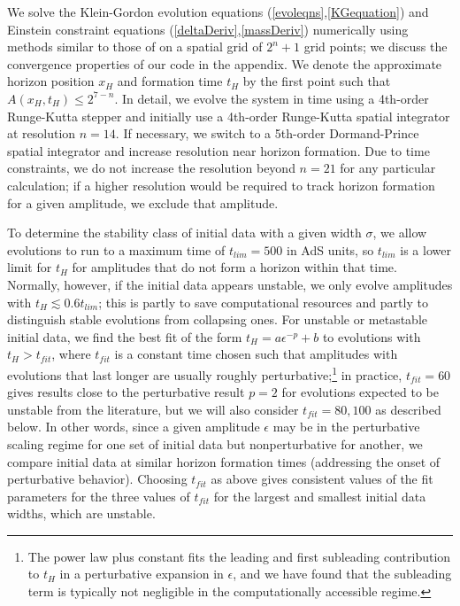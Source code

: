 \documentclass[../PhD.tex]{subfiles}
\begin{document}
We solve the Klein-Gordon evolution equations (\ref{evoleqns},\ref{KGequation})
and Einstein constraint equations (\ref{deltaDeriv},\ref{massDeriv})
numerically using methods similar to those of \cite{1308.1235} on a spatial
grid of $2^n+1$ grid points; we discuss the
convergence properties of our code in the appendix.
We denote the approximate horizon position $x_H$ and formation time $t_H$
by the first point such that $A(x_H,t_H)\leq 2^{7-n}$.
In detail, we evolve the system in time using a 4th-order Runge-Kutta
stepper and initially use a 4th-order Runge-Kutta spatial integrator at
resolution $n=14$.  If necessary, we switch to a 5th-order Dormand-Prince
spatial integrator and increase resolution near horizon formation.  Due to
time constraints, we do not increase the resolution beyond $n=21$ for any
particular calculation; if a higher resolution would be required to track
horizon formation for a given amplitude, we exclude that amplitude.

To determine the stability class of initial data with a given width $\sigma$,
we allow evolutions to run to a maximum time of $t_{lim}=500$ in AdS units, so
$t_{lim}$ is a lower limit for $t_H$ for amplitudes that do not form a horizon
within that time.  Normally, however, if the initial data appears unstable,
we only evolve amplitudes with $t_H\lesssim 0.6t_{lim}$; this is partly to
save computational resources and partly to distinguish stable evolutions from
collapsing ones.  For unstable or metastable initial data, we find the
best fit of the form $t_H=a \epsilon^{-p}+b$ to evolutions with $t_H>t_{fit}$,
where $t_{fit}$ is a constant time chosen such that amplitudes with
evolutions that last longer are usually roughly perturbative;\footnote{The
power law plus constant fits the leading and first subleading contribution
to $t_H$ in a perturbative expansion in $\epsilon$, and we have found that
the subleading term is typically not negligible in the computationally 
accessible regime.}
in practice, $t_{fit}=60$ gives results close to the perturbative result
$p=2$ for evolutions expected to be unstable from the literature, but we will
also consider $t_{fit}=80,100$ as described below. In other words, since
a given amplitude $\epsilon$ may be in the perturbative scaling regime for
one set of initial data but nonperturbative for another, we compare 
initial data at similar horizon formation times (addressing the onset of 
perturbative behavior). Choosing $t_{fit}$ as above
gives consistent values of the fit parameters for the three values of $t_{fit}$
for the largest and smallest initial data widths, which are unstable.
\end{document}
